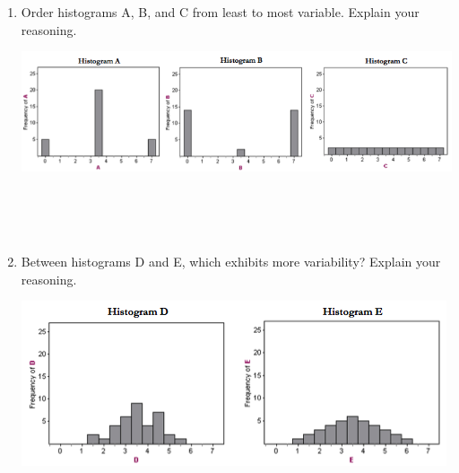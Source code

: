 \documentclass[11pt]{article}
\begin{document}
\begin{enumerate}

\item Order histograms A, B, and C from least to most variable. Explain your reasoning.

\includegraphics[width=\textwidth]{histogramsVarOrderABC}

$\:$ \\
$\:$ \\
$\:$ \\

\item Between histograms D and E, which exhibits more variability? Explain your reasoning.

\includegraphics[width=\textwidth]{histogramsVarOrderDE}

\end{enumerate}

%
\end{document}
